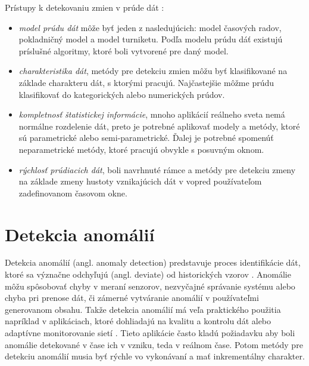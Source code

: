 \label{fig:zmeny-vseobecny-dia}

Prístupy k detekovaniu zmien v prúde dát \citep{tran2014change}:
\begin{itemize}
	\item \textit{model prúdu dát} môže byť jeden z nasledujúcich: model časových radov, pokladničný model a model turniketu. Podľa modelu prúdu dáť existujú príslušné algoritmy, ktoré boli vytvorené pre daný model.
	\item \textit{charakteristika dát}, metódy pre detekciu zmien môžu byť klasifikované na základe charakteru dát, s ktorými pracujú. Najčastejšie môžme prúdu klasifikovať do kategorických alebo numerických prúdov.
	\item \textit{kompletnosť štatistickej informácie}, mnoho aplikácií reálneho sveta nemá normálne rozdelenie dát, preto je potrebné aplikovať modely a metódy, ktoré sú parametrické alebo semi-parametrické. Ďalej je potrebné spomenúť neparametrické metódy, ktoré pracujú obvykle s posuvným oknom.
	\item \textit{rýchlosť prúdiacich dát}, boli navrhnuté rámce a metódy pre detekciu zmeny na základe zmeny hustoty vznikajúcich dát v vopred používateľom zadefinovanom časovom okne.
\end{itemize}


\section{Detekcia anomálií}
Detekcia anomálií (angl. anomaly detection) predstavuje proces identifikácie dát, ktoré sa význačne odchyľujú (angl. deviate) od historických vzorov \citep{hodge2004survey}. Anomálie môžu spôsobovať chyby v meraní senzorov, nezvyčajné správanie systému alebo chyba pri prenose dát, či zámerné vytváranie anomálií v používateľmi generovanom obsahu. 
Takže detekcia anomálií má veľa praktického použitia napríklad v aplikáciach, ktoré dohliadajú na kvalitu a kontrolu dát \citep{hill2007real} alebo adaptívne monitorovanie sietí  \citep{hill2010anomaly}. Tieto aplikácie často kladú požiadavku aby boli anomálie detekované v čase ich v vzniku, teda v reálnom čase. Potom metódy pre detekciu anomálií musia byť rýchle vo vykonávaní a mať inkrementálny charakter.\\

